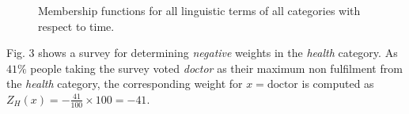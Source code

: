 \documentclass[conference]{IEEEtran}
\begin{document}
\begin{figure}
{}\hfill
{}\hfill
{}\hfill
{}
\caption{Membership functions for all linguistic terms of all categories with respect to time.}
\end{figure}

Fig. 3 shows a survey for determining \textit{negative} weights in the \textit{health} category. As $41\%$ people taking the survey voted \textit{doctor} as their maximum non fulfilment from the \textit{health} category, the corresponding weight for $x = \text{doctor}$ is computed as $Z_H(x) = -\frac{41}{100} \times 100 = -41$.
\end{document}
